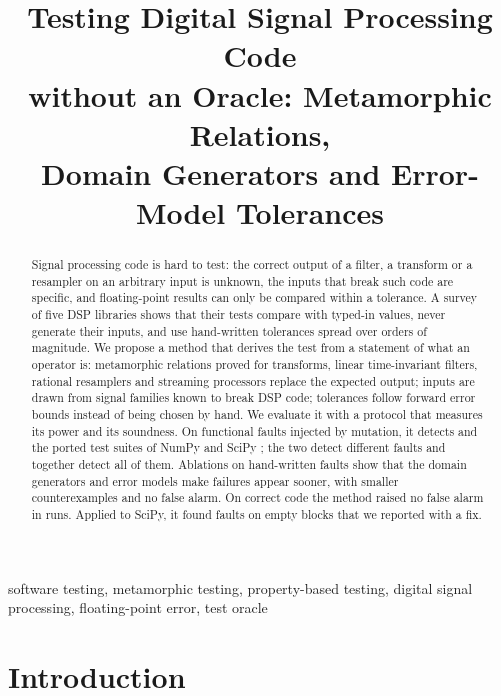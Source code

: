 \documentclass[10pt,conference]{IEEEtran}
\begin{document}
\title{Testing Digital Signal Processing Code\\without an Oracle: Metamorphic Relations,\\Domain Generators and Error-Model Tolerances}

\author{
}

\maketitle

\begin{abstract}
Signal processing code is hard to test: the correct output of a filter, a
transform or a resampler on an arbitrary input is unknown, the inputs that break
such code are specific, and floating-point results can only be compared within
a tolerance. A survey of five DSP libraries shows that their tests compare with
typed-in values, never generate their inputs, and use hand-written tolerances
spread over \surveyScipyTolDecades{} orders of magnitude. We propose a method
that derives the test from a statement of what an operator is: metamorphic
relations proved for transforms, linear time-invariant filters, rational
resamplers and streaming processors replace the expected output; inputs are
drawn from signal families known to break DSP code; tolerances follow forward
error bounds instead of being chosen by hand. We evaluate it with a protocol
that measures its power and its soundness. On \nFunctional{} functional faults
injected by mutation, it detects \killFuncDsp{} and the ported test suites of
NumPy and SciPy \killFuncSop{}; the two detect different faults and together
detect all of them. Ablations on hand-written faults show that the domain
generators and error models make failures appear sooner, with smaller
counterexamples and no false alarm. On correct code the method raised no false
alarm in \fpRuns{} runs. Applied to SciPy, it found faults on empty blocks that
we reported with a fix.
\end{abstract}

\begin{IEEEkeywords}
software testing, metamorphic testing, property-based testing, digital signal processing, floating-point error, test oracle
\end{IEEEkeywords}

\section{Introduction}
\end{document}
